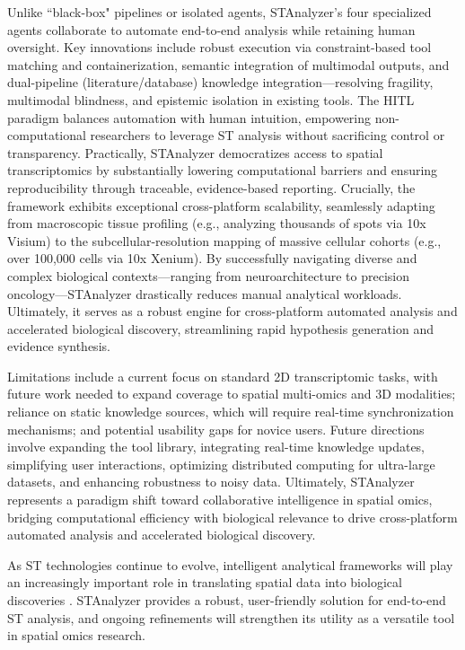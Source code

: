 \documentclass[a4,center,fleqn]{NAR}
\begin{document}
Unlike ``black-box" pipelines or isolated agents, STAnalyzer’s four specialized agents collaborate to automate end-to-end analysis while retaining human oversight. Key innovations include robust execution via constraint-based tool matching and containerization, semantic integration of multimodal outputs, and dual-pipeline (literature/database) knowledge integration—resolving fragility, multimodal blindness, and epistemic isolation in existing tools. The HITL paradigm balances automation with human intuition, empowering non-computational researchers to leverage ST analysis without sacrificing control or transparency. Practically, STAnalyzer democratizes access to spatial transcriptomics by substantially lowering computational barriers and ensuring reproducibility through traceable, evidence-based reporting. Crucially, the framework exhibits exceptional cross-platform scalability, seamlessly adapting from macroscopic tissue profiling (e.g., analyzing thousands of spots via 10x Visium) to the subcellular-resolution mapping of massive cellular cohorts (e.g., over 100,000 cells via 10x Xenium). By successfully navigating diverse and complex biological contexts—ranging from neuroarchitecture to precision oncology—STAnalyzer drastically reduces manual analytical workloads. Ultimately, it serves as a robust engine for cross-platform automated analysis and accelerated biological discovery, streamlining rapid hypothesis generation and evidence synthesis.

Limitations include a current focus on standard 2D transcriptomic tasks, with future work needed to expand coverage to spatial multi-omics and 3D modalities; reliance on static knowledge sources, which will require real-time synchronization mechanisms; and potential usability gaps for novice users. Future directions involve expanding the tool library, integrating real-time knowledge updates, simplifying user interactions, optimizing distributed computing for ultra-large datasets, and enhancing robustness to noisy data. Ultimately, STAnalyzer represents a paradigm shift toward collaborative intelligence in spatial omics, bridging computational efficiency with biological relevance to drive cross-platform automated analysis and accelerated biological discovery.

As ST technologies continue to evolve, intelligent analytical frameworks will play an increasingly important role in translating spatial data into biological discoveries \cite{williams2022introduction}. STAnalyzer provides a robust, user-friendly solution for end-to-end ST analysis, and ongoing refinements will strengthen its utility as a versatile tool in spatial omics research.
\end{document}
